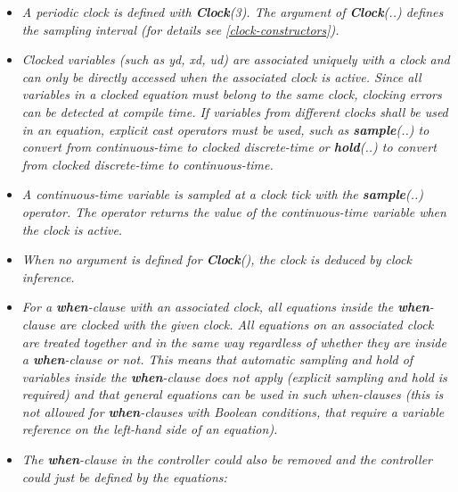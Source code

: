 \documentclass[10pt,a4paper]{report}
\begin{document}
\begin{itemize}
\item
  \emph{A periodic clock is defined with \textbf{Clock}(3). The argument
  of \textbf{Clock}(..) defines the sampling interval (for details see \ref{clock-constructors}).}
\item
  \emph{Clocked variables (such as yd, xd, ud) are associated uniquely
  with a clock and can only be directly accessed when the associated
  clock is active. Since all variables in a clocked equation must belong
  to the same clock, clocking errors can be detected at compile time. If
  variables from different clocks shall be used in an equation, explicit
  cast operators must be used, such as \textbf{sample}(..) to convert
  from continuous-time to clocked discrete-time or \textbf{hold}(..) to
  convert from clocked discrete-time to continuous-time.}
\item
  \emph{A continuous-time variable is sampled at a clock tick with the
  \textbf{sample}(..) operator. The operator returns the value of the
  continuous-time variable when the clock is active.}
\item
  \emph{When no argument is defined for \textbf{Clock}(), the clock is
  deduced by clock inference.}
\item
  \emph{For a \textbf{when}-clause with an associated clock, all
  equations inside the \textbf{when}-clause are clocked with the given
  clock. All equations on an associated clock are treated together and
  in the same way regardless of whether they are inside a
  \textbf{when}-clause or not. This means that automatic sampling and
  hold of variables inside the \textbf{when}-clause does not apply
  (explicit sampling and hold is required) and that general equations
  can be used in such when-clauses (this is not allowed for
  \textbf{when}-clauses with Boolean conditions, that require a variable
  reference on the left-hand side of an equation).}
\item
  \emph{The \textbf{when}-clause in the controller could also be removed
  and the controller could just be defined by the equations:}
  

\end{itemize}
\end{document}
